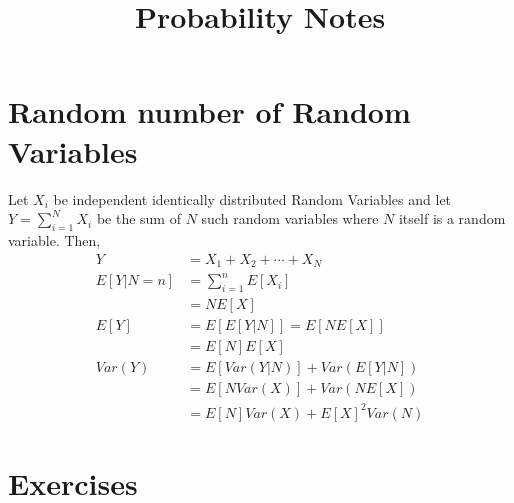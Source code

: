 \documentclass[11pt, a4paper]{article}
\title{Probability Notes}
\begin{document}
    \maketitle{}
    \tableofcontents
    \cleardoublepage

    
    

    \section{Random number of Random Variables}
    Let $X_{i}$ be independent identically distributed Random Variables and let $Y = \sum_{i=1}^{N} X_{i}$ be the sum of $N$ such random variables where $N$ itself is a random variable. Then,
    \begin{align*}
        Y &= X_{1} + X_{2} + \cdots + X_{N}\\
        E[Y|N=n] &= \sum_{i=1}^{n}E[X_{i}]\\
                &= NE[X]\\
        E[Y] &= E[E[Y|N]] = E[NE[X]]\\
            &= E[N]E[X] \tag*{since $E[X]$ will be a number}\\
        Var(Y) &= E[Var(Y|N)] + Var(E[Y|N])\\
            &= E[NVar(X)] + Var(NE[X])\\
            &= E[N]Var(X) + E[X]^{2}Var(N)
    \end{align*}

    
    
    
    
    
    
    
    
    
    
    

    \section{Exercises}
    
    
\end{document}

